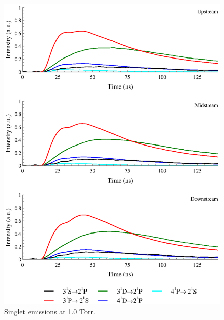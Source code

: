 \begin{figure}
  \centering
  \includegraphics{./chapters/extraem/figures/1torr_s.eps}
  \caption{Singlet emissions at 1.0 Torr.}
\end{figure}
